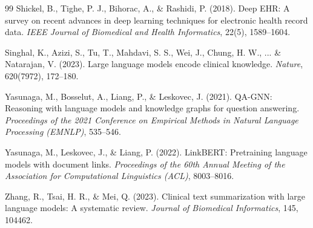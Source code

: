 \documentclass[11pt, a4paper]{article}
\begin{document}
\begin{thebibliography}{99}
Shickel, B., Tighe, P. J., Bihorac, A., \& Rashidi, P. (2018).
Deep EHR: A survey on recent advances in deep learning techniques for electronic health record data.
\textit{IEEE Journal of Biomedical and Health Informatics}, 22(5), 1589--1604.

Singhal, K., Azizi, S., Tu, T., Mahdavi, S. S., Wei, J., Chung, H. W., ... \& Natarajan, V. (2023).
Large language models encode clinical knowledge.
\textit{Nature}, 620(7972), 172--180.

Yasunaga, M., Bosselut, A., Liang, P., \& Leskovec, J. (2021).
QA-GNN: Reasoning with language models and knowledge graphs for question answering.
\textit{Proceedings of the 2021 Conference on Empirical Methods in Natural Language Processing (EMNLP)}, 535--546.

Yasunaga, M., Leskovec, J., \& Liang, P. (2022).
LinkBERT: Pretraining language models with document links.
\textit{Proceedings of the 60th Annual Meeting of the Association for Computational Linguistics (ACL)}, 8003--8016.

Zhang, R., Tsai, H. R., \& Mei, Q. (2023).
Clinical text summarization with large language models: A systematic review.
\textit{Journal of Biomedical Informatics}, 145, 104462.

\end{thebibliography}
\end{document}
